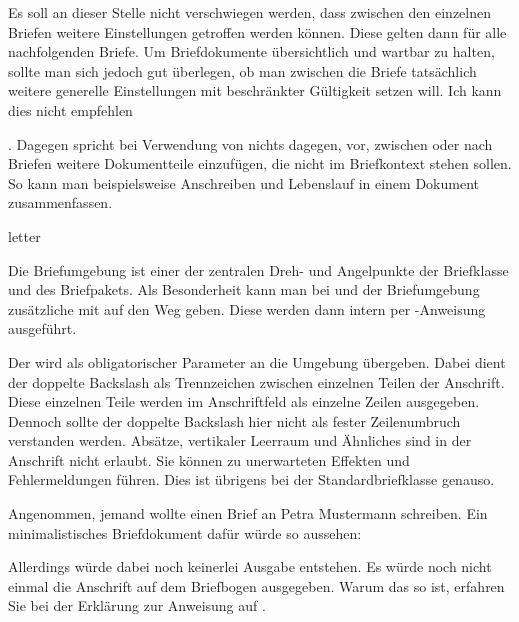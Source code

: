 Es soll an dieser Stelle nicht verschwiegen werden, dass zwischen den
einzelnen Briefen weitere Einstellungen getroffen werden können. Diese
gelten dann für alle nachfolgenden Briefe. Um Briefdokumente
übersichtlich und wartbar zu halten, sollte man sich jedoch gut
überlegen, ob man zwischen die Briefe tatsächlich weitere generelle
Einstellungen mit beschränkter Gültigkeit setzen will. Ich kann dies
nicht empfehlen%
\iffalse
, da die Suche nach Einstellungen dadurch erschwert wird%
\fi
%
. Dagegen spricht bei Verwendung von  nichts dagegen, vor,
zwischen oder nach Briefen weitere Dokumentteile einzufügen, die nicht im
Briefkontext stehen sollen. So kann man beispielsweise Anschreiben und
Lebenslauf in einem Dokument zusammenfassen.

\begin{Declaration}
  \begin{Environment}{letter}
  \end{Environment}
\end{Declaration}
%
Die Briefumgebung  ist einer der zentralen Dreh- und
Angelpunkte der Briefklasse und des Briefpakets. Als
Besonderheit kann man bei
 und  der Briefumgebung zusätzliche
 mit auf den Weg geben.  Diese werden dann intern per
-Anweisung ausgeführt.

Der  wird als obligatorischer Parameter an die Umgebung
übergeben. Dabei dient der doppelte Backslash als
Trennzeichen zwischen einzelnen Teilen der Anschrift. Diese einzelnen Teile
werden im Anschriftfeld als einzelne Zeilen ausgegeben. Dennoch sollte der
doppelte Backslash hier nicht als fester Zeilenumbruch verstanden
werden. Absätze, vertikaler Leerraum und Ähnliches sind in der Anschrift nicht
erlaubt. Sie können zu unerwarteten Effekten und Fehlermeldungen führen. Dies
ist übrigens bei der Standardbriefklasse genauso.

\begin{Example}
  \label{desc:\LabelBase.env.letter.example}%
  Angenommen, jemand wollte einen Brief an Petra Mustermann schreiben.
  Ein minimalistisches Briefdokument dafür würde so aussehen:
  Allerdings würde dabei noch keinerlei Ausgabe
  entstehen. Es würde noch nicht einmal die Anschrift auf dem Briefbogen
  ausgegeben. Warum das so ist, erfahren Sie bei der Erklärung zur Anweisung
   auf .
\end{Example}


